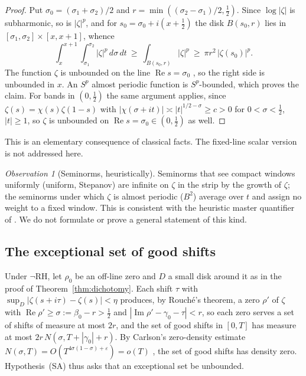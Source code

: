 \documentclass[11pt]{amsart}
\theoremstyle{definition}
\theoremstyle{remark}
\newtheorem{observation}[theorem]{Observation}
\newcommand{\RH}{\mathrm{RH}}
\DeclareMathOperator{\Real}{Re}
\DeclareMathOperator{\Imag}{Im}
\begin{document}
\begin{proof}
Put $\sigma_0=(\sigma_1+\sigma_2)/2$ and
$r=\min((\sigma_2-\sigma_1)/2,\tfrac12)$. Since $\log|\zeta|$ is
subharmonic, so is $|\zeta|^p$, and for $s_0=\sigma_0+i(x+\tfrac12)$ the
disk $B(s_0,r)$ lies in $[\sigma_1,\sigma_2]\times[x,x+1]$, whence
\[
\int_x^{x+1}\!\!\int_{\sigma_1}^{\sigma_2}|\zeta|^p\,d\sigma\,dt
\ \ge\ \int_{B(s_0,r)}|\zeta|^p\ \ge\ \pi r^2\,|\zeta(s_0)|^p .
\]
The function $\zeta$ is unbounded on the line $\Real s=\sigma_0$
\cite[Thm.~8.12]{Titchmarsh}, so the right side is unbounded in $x$. An
$S^p$ almost periodic function is $S^p$-bounded, which proves the claim. For
bands in $(0,\tfrac12)$ the same argument applies, since
$\zeta(s)=\chi(s)\zeta(1-s)$ with $|\chi(\sigma+it)|\asymp|t|^{1/2-\sigma}\ge c>0$
for $0<\sigma<\tfrac12$, $|t|\ge1$, so $\zeta$ is unbounded on
$\Real s=\sigma_0\in(0,\tfrac12)$ as well.
\end{proof}

This is an elementary consequence of classical facts. The fixed-line scalar
version is not addressed here.

\begin{observation}[Seminorms, heuristically]\label{obs:seminorm}
Seminorms that see compact windows uniformly (uniform, Stepanov) are
infinite on $\zeta$ in the strip by the growth of $\zeta$; the seminorms
under which $\zeta$ is almost periodic ($B^2$) average over $t$ and assign
no weight to a fixed window. This is consistent with the heuristic master
quantifier of \cite[Principle~3.1]{P29}. We do not formulate or prove a
general statement of this kind.
\end{observation}

\subsection{The exceptional set of good shifts}\label{ssec:wall}
Under $\neg\RH$, let $\rho_0$ be an off-line zero and $D$ a small disk
around it as in the proof of Theorem~\ref{thm:dichotomy}. Each shift $\tau$
with $\sup_D|\zeta(s+i\tau)-\zeta(s)|<\eta$ produces, by Rouch\'e's theorem,
a zero $\rho'$ of $\zeta$ with $\Real\rho'\ge\sigma:=\beta_0-r>\tfrac12$ and
$|\Imag\rho'-\gamma_0-\tau|<r$, so each zero serves a set of shifts of
measure at most $2r$, and the set of good shifts in $[0,T]$ has measure at
most $2r\,N(\sigma,T+|\gamma_0|+r)$. By Carlson's zero-density estimate
$N(\sigma,T)=O(T^{4\sigma(1-\sigma)+\varepsilon})=o(T)$
\cite[Thm.~9.17]{Titchmarsh}, the set of good shifts has density zero.
Hypothesis~(SA) thus asks that an exceptional set be unbounded.
\end{document}
